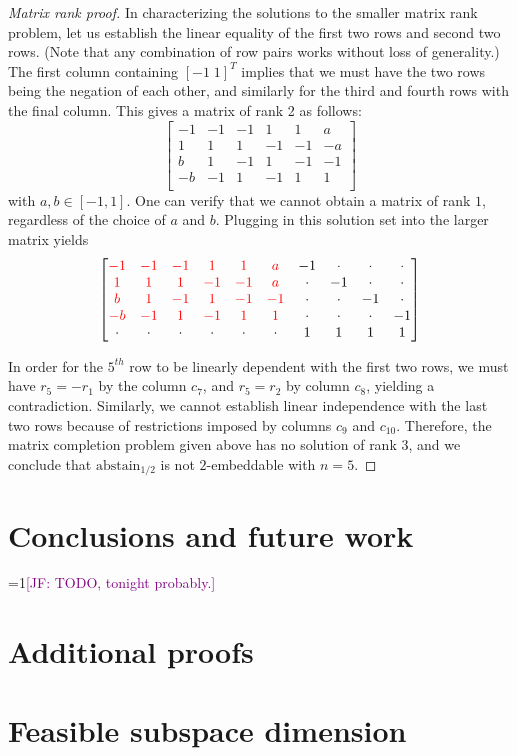 \documentclass[anon]{colt2020} %
\newcommand{\Comments}{1}
\newcommand{\mynote}[2]{\ifnum\Comments=1\textcolor{#1}{#2}\fi}
\newcommand{\jessie}[1]{\mynote{purple}{[JF: #1]}}
\newcommand{\abstain}[1]{\mathrm{abstain}_{#1}}
\begin{document}
\begin{proof}[Matrix rank proof]
  In characterizing the solutions to the smaller matrix rank problem, let us establish the linear equality of the first two rows and second two rows.
  (Note that any combination of row pairs works without loss of generality.)
  The first column containing $[-1 \; 1]^T$ implies that we must have the two rows being the negation of each other, and similarly for the third and fourth rows with the final column.
  This gives a matrix of rank 2 as follows:
  \[
    \begin{bmatrix}
  -1 & -1 & -1 & 1 & 1 & a \\
  1 & 1 & 1 & -1 & -1 & -a \\
  b & 1 & -1 & 1 & -1 & -1 \\
  -b & -1 & 1 & -1 & 1 & 1 \\
  \end{bmatrix}
  \] with $a, b \in [-1,1]$.
  One can verify that we cannot obtain a matrix of rank $1$, regardless of the choice of $a$ and $b$.
  Plugging in this solution set into the larger matrix yields
  \[
  \begin{bmatrix}
  {\color{red} -1} & {\color{red} -1} & {\color{red} -1} & {\color{red} 1} & {\color{red} 1} & {\color{red} a} & -1 & \cdot & \cdot & \cdot \\
  {\color{red} 1} & {\color{red} 1} & {\color{red} 1} & {\color{red} -1} & {\color{red} -1} & {\color{red} a} & \cdot & -1 & \cdot & \cdot \\
  {\color{red} b} & {\color{red} 1} & {\color{red} -1} & {\color{red} 1} & {\color{red} -1} & {\color{red} -1} & \cdot & \cdot & -1 & \cdot \\
  {\color{red} -b} & {\color{red} -1} & {\color{red} 1} & {\color{red} -1} & {\color{red} 1} & {\color{red} 1} & \cdot & \cdot & \cdot & -1 \\
  \cdot & \cdot & \cdot & \cdot & \cdot & \cdot & 1 & 1 & 1 & 1\\
  \end{bmatrix}
  \]

  In order for the $5^{th}$ row to be linearly dependent with the first two rows, we must have $r_5 = -r_1$ by the column $c_7$, and $r_5 = r_2$ by column $c_8$, yielding a contradiction.
  Similarly, we cannot establish linear independence with the last two rows because of restrictions imposed by columns $c_9$ and $c_{10}$.
  Therefore, the matrix completion problem given above has no solution of rank 3, and we conclude that $\abstain{1/2}$ is not $2$-embeddable with $n=5$.
\end{proof}

\section{Conclusions and future work}
\jessie{TODO, tonight probably.}

\newpage



\newpage
\appendix

\section{Additional proofs}


\section{Feasible subspace dimension}
\end{document}
